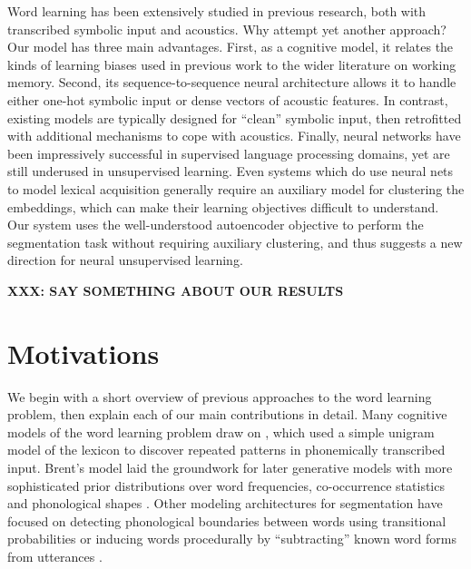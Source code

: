 \documentclass[11pt,letterpaper]{article}
\newcommand{\xxx}[1]{\textbf{\color{red}XXX: #1}}
\begin{document}
Word learning has been extensively studied in previous research, both
with transcribed symbolic input and acoustics. Why attempt yet another
approach? Our model has three main advantages. First, as a cognitive
model, it relates the kinds of learning biases used in previous work
to the wider literature on working memory. Second, its
sequence-to-sequence neural architecture allows it to handle either
one-hot symbolic input or dense vectors of acoustic features. In
contrast, existing models are typically designed for ``clean''
symbolic input, then retrofitted with additional mechanisms to cope
with acoustics. Finally, neural networks have been impressively
successful in supervised language processing domains, yet are still
underused in unsupervised learning. Even systems which do use neural
nets to model lexical acquisition generally require an auxiliary model
for clustering the embeddings, which can make their learning
objectives difficult to understand. Our system uses the
well-understood autoencoder objective to perform the segmentation task
without requiring auxiliary clustering, and thus suggests a new
direction for neural unsupervised learning.

\xxx{SAY SOMETHING ABOUT OUR RESULTS}

\section{Motivations}

We begin with a short overview of previous approaches to the word
learning problem, then explain each of our main contributions in
detail. Many cognitive models of the word learning problem draw on
, which used a simple unigram model of the lexicon to
discover repeated patterns in phonemically transcribed input. Brent's
model laid the groundwork for later generative models with more
sophisticated prior distributions over word frequencies, co-occurrence
statistics and phonological shapes \cite{xxx}. Other modeling
architectures for segmentation have focused on detecting phonological
boundaries between words using transitional probabilities \cite{xxx}
or inducing words procedurally by ``subtracting'' known word forms
from utterances \cite{Lignos11}.
\end{document}
